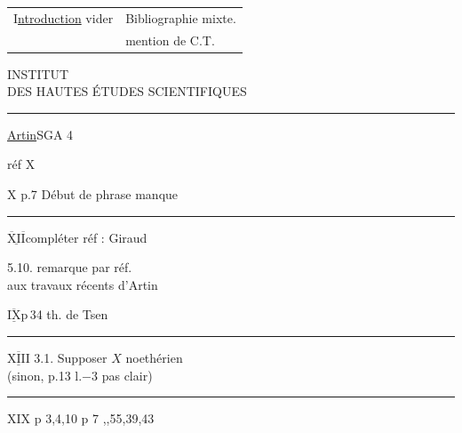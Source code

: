 \noindent\begin{tabular}{@{}l|l@{}}
I\uline{ntroduction} vider & Bibliographie mixte.\\
 & mention de C.T.
\end{tabular}

\begin{center}
INSTITUT\\
DES HAUTES ÉTUDES SCIENTIFIQUES\\
\rule{2.3em}{0.4pt}
\end{center}

\uline{Artin}\qquad SGA 4

réf \quad X \quad [1]

X \qquad p.7 \qquad Début de phrase manque

\noindent\rule{\linewidth}{0.4pt}

$\underline{\overline{\mathrm{X}}\mathrm{I}\overline{\mathrm{I}}}$\qquad compléter réf : Giraud

5.10. \qquad {} remarque par réf.\\
\hspace*{5em}aux travaux récents d'Artin

{\color{red!75!black}
\noindent{}

$\underline{\overline{\mathrm{IX}}}$\qquad p\,34 \qquad {} th. de Tsen
}

\noindent\rule{.6\linewidth}{0.4pt}

$\underline{\overline{\mathrm{XIII}}}$\qquad {} 3.1. \qquad Supposer $X$ noethérien\\
\hspace*{7em}(sinon, p.13 l.$-3$ pas clair)

{\color{gray!80!black}
\noindent\rule{.42\linewidth}{0.4pt}

XIX \qquad p 3,4,10 \qquad p 7 ,,55,39,43
}

